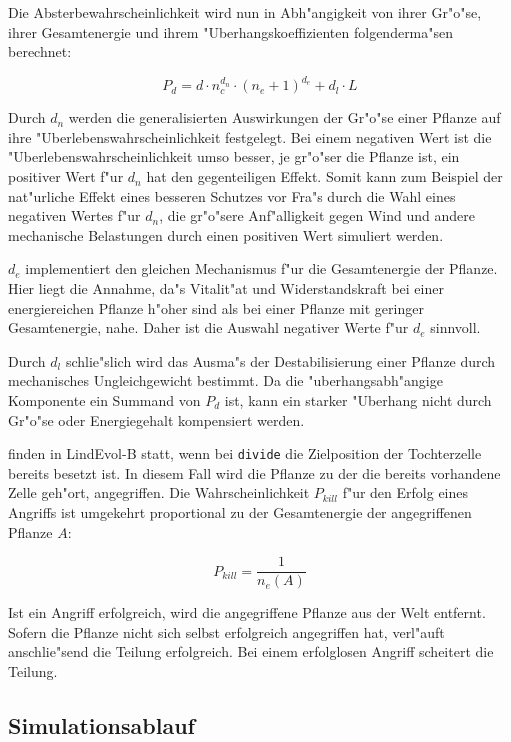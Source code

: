 Die Absterbewahrscheinlichkeit wird nun in Abh"angigkeit von ihrer Gr"o"se,
ihrer Gesamtenergie und ihrem "Uberhangskoeffizienten folgenderma"sen berechnet:

\begin{equation}
\label{deathprob-eq}
P_d = d \cdot n_c^{d_n} \cdot (n_e + 1)^{d_e} + d_l \cdot L
\end{equation}

Durch $d_n$ werden die generalisierten Auswirkungen der Gr"o"se einer Pflanze
auf ihre "Uberlebenswahrscheinlichkeit festgelegt. Bei einem negativen Wert
ist die "Uberlebenswahrscheinlichkeit umso besser, je gr"o"ser die Pflanze
ist, ein positiver Wert f"ur $d_n$ hat den gegenteiligen Effekt. Somit kann
zum Beispiel der nat"urliche Effekt eines besseren Schutzes vor Fra"s durch
die Wahl eines negativen Wertes f"ur $d_n$, die gr"o"sere Anf"alligkeit gegen
Wind und andere mechanische Belastungen durch einen positiven Wert simuliert
werden.

$d_e$ implementiert den gleichen Mechanismus f"ur die Gesamtenergie der Pflanze.
Hier liegt die Annahme, da"s Vitalit"at und
Widerstandskraft bei einer energiereichen Pflanze h"oher sind als bei einer
Pflanze mit geringer Gesamtenergie, nahe. 
Daher ist die Auswahl negativer Werte
f"ur $d_e$ sinnvoll.

Durch $d_l$ schlie"slich wird das Ausma"s der Destabilisierung einer Pflanze
durch mechanisches Ungleichgewicht bestimmt. Da die "uberhangsabh"angige
Komponente ein Summand von $P_d$ ist, kann ein starker "Uberhang nicht
durch Gr"o"se oder Energiegehalt kompensiert werden.

 finden in LindEvol-B statt, wenn bei \verb|divide|
die Zielposition der Tochterzelle bereits besetzt ist. In diesem Fall wird
die Pflanze zu der die bereits vorhandene Zelle geh"ort, angegriffen.
Die Wahrscheinlichkeit $P_{\mathit{kill}}$
f"ur den Erfolg eines Angriffs ist umgekehrt proportional zu der Gesamtenergie
der angegriffenen Pflanze $A$:

\begin{equation}
P_{\mathit{kill}} = \frac{1}{n_e(A)}
\end{equation}

Ist ein Angriff erfolgreich, wird die angegriffene Pflanze aus der Welt
entfernt. Sofern die Pflanze nicht sich selbst erfolgreich angegriffen
hat, verl"auft anschlie"send die Teilung erfolgreich. Bei einem erfolglosen
Angriff scheitert die Teilung.


\subsection{Simulationsablauf}

